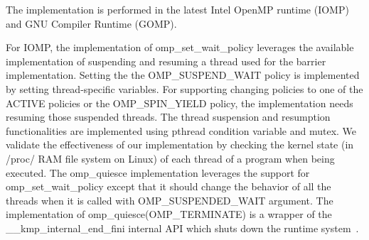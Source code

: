 The implementation is performed in the latest Intel OpenMP runtime (IOMP) and GNU Compiler Runtime (GOMP). %

For IOMP, the implementation of {\sf omp\_set\_wait\_policy} leverages the available 
implementation of suspending and resuming a thread used for the barrier implementation. Setting the 
the {\sf OMP\_SUSPEND\_WAIT} policy is implemented by setting thread-specific variables. For
supporting changing policies to one of the {\sf ACTIVE} policies or the {\sf OMP\_SPIN\_YIELD} policy, 
the implementation needs resuming those suspended threads. %
The thread suspension and resumption functionalities are implemented using pthread condition variable and mutex.  
We validate the effectiveness of our implementation by checking the kernel state (in /proc/ RAM file system on Linux) 
of each thread of a program when being executed. 
The {\sf omp\_quiesce} implementation leverages the support for {\sf omp\_set\_wait\_policy} except that it 
should change the behavior of all the threads when it is called with {\sf OMP\_SUSPENDED\_WAIT} argument. 
The implementation of {\sf omp\_quiesce(OMP\_TERMINATE)} is a wrapper of 
the {\sf \_\_kmp\_internal\_end\_fini} internal API which shuts down the runtime system~\cite{iccmanual}. 



